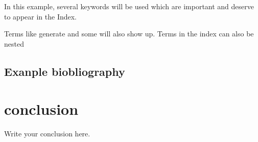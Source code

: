 \documentclass[a4paper,12pt,times,numbered,print,index, oneside]{template/UBtemplate}
\begin{document}
In this example, several keywords will be 
used which are important and deserve to appear in the 
Index.

Terms like generate and some 
will also show up. Terms in the index can also be 
nested 


\section{Exanple biobliography}


\chapter{conclusion}

Write your conclusion here.












\end{document}
